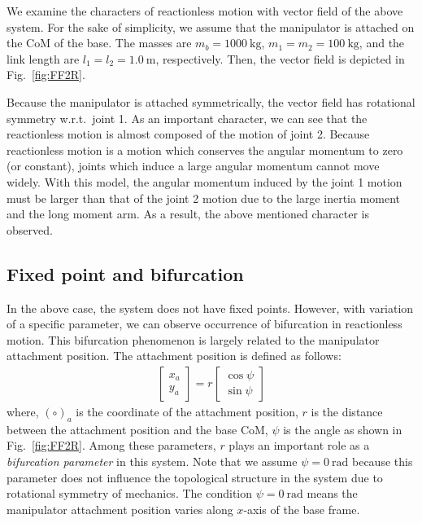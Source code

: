 \documentclass[preprint,12pt]{elsarticle}
\def\fig#1{{Fig.~\ref{fig:#1}}}
\def\unit#1{{~\mathrm{#1}}}
\begin{document}
We examine the characters of reactionless motion with vector field of the above system.
For the sake of simplicity,
we assume that the manipulator is attached on the CoM of the base.
The masses are $m_{b} = 1000\unit{kg}$, $m_{1} = m_{2} = 100\unit{kg}$,
and the link length are $l_{1} = l_{2} = 1.0\unit{m}$, respectively.
Then, the vector field is depicted in \fig{FF2R}.

Because the manipulator is attached symmetrically,
the vector field has rotational symmetry w.r.t.\ joint 1.
As an important character,
we can see that the reactionless motion is almost composed of the motion of joint 2.
Because reactionless motion is a motion which conserves the angular momentum to zero (or constant),
joints which induce a large angular momentum cannot move widely.
With this model,
the angular momentum induced by the joint 1 motion must be larger than
that of the joint 2 motion due to the large inertia moment and the long moment arm. 
As a result, the above mentioned character is observed.

\subsection{Fixed point and bifurcation}
\label{sec:ANALYSIS_FIXED}
In the above case,
the system does not have fixed points.
However, with variation of a specific parameter,
we can observe occurrence of bifurcation in reactionless motion.
This bifurcation phenomenon is largely related to the manipulator attachment position.
The attachment position is defined as follows:
%
\begin{align}
  \begin{bmatrix}
    x_{a}\\
    y_{a}
  \end{bmatrix}
  =
  r
  \begin{bmatrix}
    \cos\psi\\
    \sin\psi
  \end{bmatrix}
\end{align}
%
where, $(\circ)_{a}$ is the coordinate of the attachment position,
$r$ is the distance between the attachment position and the base CoM,
$\psi$ is the angle as shown in \fig{FF2R}.
Among these parameters, $r$ plays an important role as a \textit{bifurcation parameter} in this system.
Note that we assume $\psi = 0\unit{rad}$ because this parameter does not influence the topological structure
in the system due to rotational symmetry of mechanics.
The condition $\psi = 0\unit{rad}$ means the manipulator
attachment position varies along $x$-axis of the base frame.
\end{document}
